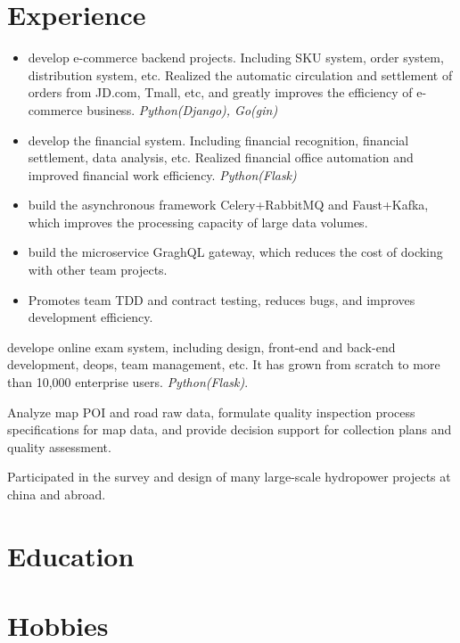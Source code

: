 \documentclass[11pt,a4paper]{moderncv}
\newcommand{\pl}[1]{\textit{\color{plblue} #1}}
\begin{document}
\section{Experience}
{
  \begin{itemize}
    \item develop e-commerce backend projects. Including SKU system, order system, distribution system, etc. Realized the automatic circulation and settlement of orders from JD.com, Tmall, etc, and greatly improves the efficiency of e-commerce business. \pl{Python(Django), Go(gin)}
    \item develop the financial system. Including financial recognition, financial settlement, data analysis, etc. Realized financial office automation and improved financial work efficiency. \pl{Python(Flask)}
    \item build the asynchronous framework Celery+RabbitMQ and Faust+Kafka, which improves the processing capacity of large data volumes.
    \item build the microservice GraghQL gateway, which reduces the cost of docking with other team projects.
    \item Promotes team TDD and contract testing, reduces bugs, and improves development efficiency.
  \end{itemize}
}

{
  develope online exam system, including design, front-end and back-end development, deops, team management, etc. It has grown from scratch to more than 10,000 enterprise users. \pl{Python(Flask)}.
}

{
  Analyze map POI and road raw data, formulate quality inspection process specifications for map data, and provide decision support for collection plans and quality assessment.
}

{
  Participated in the survey and design of many large-scale hydropower projects at china and abroad.
}

\section{Education}
{}

\section{Hobbies}
\end{document}
